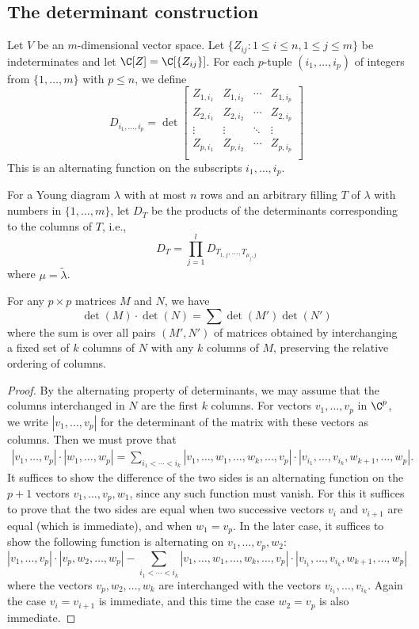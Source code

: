 \subsection{The determinant construction}
Let $V$ be an $m$-dimensional vector space. Let $\{Z_{ij}:1\leq i\leq n,1\leq j\leq m\}$ be indeterminates and let $\C[Z]=\C[\{Z_{ij}\}]$. For each $p$-tuple $(i_1,\dots,i_p)$ of integers from $\{1,\dots,m\}$ with $p\leq n$, we define
\[D_{i_1,\dots,i_p}=\det\begin{bmatrix}
Z_{1,i_1}&Z_{1,i_2}&\cdots&Z_{1,i_p}\\
Z_{2,i_1}&Z_{2,i_2}&\cdots&Z_{2,i_p}\\
\vdots&\vdots&\ddots&\vdots\\
Z_{p,i_1}&Z_{p,i_2}&\cdots&Z_{p,i_p}\\
\end{bmatrix}\]
This is an alternating function on the subscripts $i_1,\dots,i_p$.\par
For a Young diagram $\lambda$ with at most $n$ rows and an arbitrary filling $T$ of $\lambda$ with numbers in $\{1,\dots,m\}$, let $D_T$ be the products of the determinants corresponding to the columns of $T$, i.e.,
\[D_T=\prod_{j=1}^{l}D_{T_{1,j},\dots,T_{\mu_j,j}}\]
where $\mu=\tilde{\lambda}$.
\begin{lemma}
For any $p\times p$ matrices $M$ and $N$, we have
\[\det(M)\cdot\det(N)=\sum\det(M')\det(N')\]
where the sum is over all pairs $(M',N')$ of matrices obtained by interchanging a fixed set of $k$ columns of $N$ with any $k$ columns of $M$, preserving the relative ordering of columns. 
\end{lemma}
\begin{proof}
By the alternating property of determinants, we may assume that the columns interchanged in $N$ are the first $k$ columns. For vectors $v_1,\dots,v_p$ in $\C^p$, we write $|v_1,\dots,v_p|$ for the determinant of the matrix with these vectors as columns. Then we must prove that
\begin{align*}
|v_1,\dots,v_p|\cdot|w_1,\dots,w_p|=\sum_{i_1<\cdots<i_k}|v_1,\dots,w_1,\dots,w_k,\dots,v_p|\cdot|v_{i_1},\dots,v_{i_k},w_{k+1},\dots,w_p|.
\end{align*}
It suffices to show the difference of the two sides is an alternating function on the $p+1$ vectors $v_1,\dots,v_p,w_1$, since any such function must vanish. For this it suffices to prove that the two sides are equal when two successive vectors $v_i$ and $v_{i+1}$ are equal (which is immediate), and when $w_1=v_p$. In the later case, it suffices to show the following function is alternating on $v_1,\dots,v_p,w_2$:
\[|v_1,\dots,v_p|\cdot|v_p,w_2,\dots,w_p|-\sum_{i_1<\cdots<i_k}|v_1,\dots,w_1,\dots,w_k,\dots,v_p|\cdot|v_{i_1},\dots,v_{i_k},w_{k+1},\dots,w_p|\]
where the vectors $v_p,w_2,\dots,w_k$ are interchanged with the vectors $v_{i_1},\dots,v_{i_k}$. Again the case $v_i=v_{i+1}$ is immediate, and this time the case $w_2=v_p$ is also immediate.
\end{proof}
